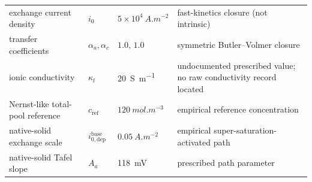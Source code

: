\documentclass[11pt]{article}
\begin{document}
\begin{table}[h]
\begin{tabular}{@{}p{}p{}p{}p{}@{}}
exchange current density & $i_0$ & $5\times10^{4}~\si{A.m^{-2}}$ & fast-kinetics closure (not intrinsic)\\
transfer coefficients & $\alpha_a,\alpha_c$ & $1.0,\,1.0$ & symmetric Butler--Volmer closure\\
ionic conductivity & $\kappa_l$ & \SI{20}{S.m^{-1}} & undocumented prescribed value; no raw conductivity record located\\
Nernst-like total-pool reference & $c_{\mathrm{ref}}$ & $120~\si{mol.m^{-3}}$ & empirical reference concentration\\
native-solid exchange scale & $i_{0,\mathrm{dep}}^{\mathrm{base}}$ & $0.05~\si{A.m^{-2}}$ & empirical super-saturation-activated path\\
native-solid Tafel slope & $A_a$ & \SI{118}{mV} & prescribed path parameter\\
\bottomrule
\end{tabular}
\end{table}
\end{document}
